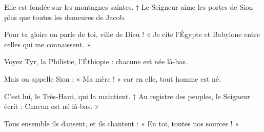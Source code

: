 \item Elle est fondée sur les montagnes saintes. † Le Seigneur aime les portes de Sion plus que toutes les demeures de Jacob.
\item Pour ta gloire on parle de toi, ville de Dieu ! « Je cite l'Égypte et Babylone entre celles qui me connaissent. »
\item Voyez Tyr, la Philistie, l'Éthiopie : chacune est née là-bas.
\item Mais on appelle Sion : « Ma mère ! » car en elle, tout homme est né. 
\item C'est lui, le Très-Haut, qui la maintient. † Au registre des peuples, le Seigneur écrit : Chacun est né là-bas. »
\item Tous ensemble ils dansent, et ils chantent : « En toi, toutes nos sources ! »
